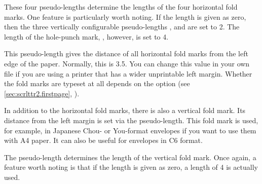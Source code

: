 \begin{Declaration}
\end{Declaration}
These four pseudo-lengths determine the
lengths of the four horizontal fold marks. One feature is
particularly worth noting. If the length is given as zero, then the three
vertically configurable pseudo-lengths ,
 and  are set to 2.
The length of the hole-punch mark, , however, is set
to 4.%
\EndIndexGroup


\begin{Declaration}
\end{Declaration}
This pseudo-length gives the distance of all horizontal fold marks from the
left edge of the paper. Normally, this is 3.5. You
can change this value in your own  file if you are using a printer
that has a wider unprintable left margin. Whether the fold marks are typeset
at all depends on the option %
%
 (see
\autoref{sec:scrlttr2.firstpage}, ).
%
\EndIndexGroup


\begin{Declaration}
\end{Declaration}
In addition to the horizontal fold marks,
there is also a vertical fold mark. Its distance from the left margin is set
via the  pseudo-length. This fold mark is used, for
example, in Japanese Chou- or You-format envelopes if you want to use them
with A4 paper. It can also be useful for envelopes in C6 format.%
\EndIndexGroup


\begin{Declaration}
\end{Declaration}
The 
pseudo-length determines the length of the vertical fold mark. Once again, a
feature worth noting is that if the length is given as zero, a length of
4 is actually used.%
\EndIndexGroup


